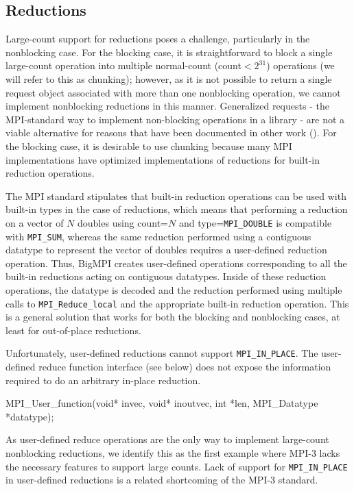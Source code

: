 
\subsection{Reductions}
\label{sec:reductions}

Large-count support for reductions poses a challenge, particularly in the nonblocking case.
For the blocking case, it is straightforward to block a single large-count operation into
multiple normal-count (count$<2^{31}$) operations (we will refer to this as chunking); 
however, as it is not possible to return a single request object associated with more than 
one nonblocking operation, we cannot implement nonblocking reductions in this manner.
Generalized requests - the MPI-standard way to implement non-blocking operations 
in a library - are not a viable alternative for reasons that have been documented 
in other work (\cite{latham:grequest-extensions}).
For the blocking case, it is desirable to use chunking because many MPI implementations 
have optimized implementations of reductions for built-in reduction operations.

The MPI standard stipulates that built-in reduction operations can be used with built-in types
in the case of reductions, which means that performing a reduction on a vector of $N$
doubles using count=$N$ and type=\texttt{MPI\_DOUBLE} is compatible with \texttt{MPI\_SUM},
whereas the same reduction performed using a contiguous datatype to represent the vector
of doubles requires a user-defined reduction operation.
Thus, BigMPI creates user-defined operations corresponding to all the built-in reductions
acting on contiguous datatypes.  Inside of these reduction operations, the datatype is
decoded and the reduction performed using multiple calls to \texttt{MPI\_Reduce\_local}
and the appropriate built-in reduction operation.
This is a general solution that works for both the blocking and nonblocking cases,
at least for out-of-place reductions.

Unfortunately, user-defined reductions cannot support \texttt{MPI\_IN\_PLACE}.
The user-defined reduce function interface (see below) does not expose
the information required to do an arbitrary in-place reduction.
\begin{code}
MPI_User_function(void* invec, void* inoutvec, 
                  int *len, MPI_Datatype *datatype);
\end{code}
As user-defined reduce operations are the only way to implement
large-count nonblocking reductions, we identify this as the first example
where MPI-3 lacks the necessary features to support large counts.
Lack of support for \texttt{MPI\_IN\_PLACE} in user-defined reductions
is a related shortcoming of the MPI-3 standard.